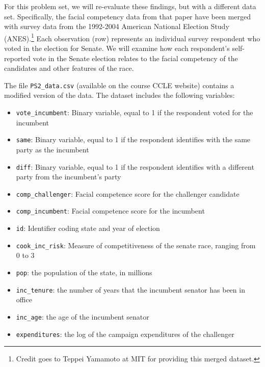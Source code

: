 \documentclass[11pt,english]{article}
\begin{document}
For this problem set, we will re-evaluate these findings, but with a different data set. Specifically, the facial competency data from that paper have been merged with survey data from the 1992-2004 American National Election Study (ANES).\footnote{Credit goes to Teppei Yamamoto at MIT for providing this merged dataset.} Each observation (row) represents an individual survey respondent who voted in the election for Senate. We will examine how each respondent's self-reported vote in the Senate election relates to the facial competency of the candidates and other features of the race.

The file \verb|PS2_data.csv| (available on the course CCLE website) contains
a modified version of the data. The dataset includes the following variables:
\begin{itemize}
\item \verb|vote_incumbent|: Binary variable, equal to 1 if the respondent
voted for the incumbent
\item \verb|same|: Binary variable, equal to 1 if the respondent identifies with the same party as the incumbent
\item \verb|diff|: Binary variable, equal to 1 if the respondent identifies
with a different party from the incumbent's party
\item \verb|comp_challenger|: Facial competence score for the challenger
candidate
\item \verb|comp_incumbent|: Facial competence score for the incumbent
\item \verb|id|: Identifier coding state and year of election
\item \verb|cook_inc_risk|: Measure of competitiveness of the senate race, ranging from 0 to 3
\item \verb|pop|: the population of the state, in millions
\item \verb|inc_tenure|: the number of years that the incumbent senator
has been in office
\item \verb|inc_age|: the age of the incumbent senator
\item \verb|expenditures|: the log of the campaign expenditures of the
challenger
\end{itemize}
\end{document}
